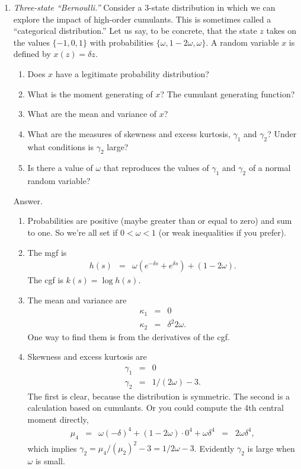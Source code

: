 \begin{enumerate}
\begin{enumerate}
\end{enumerate}

\item {\it Three-state ``Bernoulli.''\/}
Consider a 3-state distribution
in which we can explore the impact of high-order cumulants.
This is sometimes called a ``categorical distribution.''
Let us say, to be concrete, that the state $z$ takes on the values
 $\{-1, 0, 1\}$ with
 probabilities $\{\omega, 1-2\omega, \omega \}$.
 A random variable $x$ is defined by $x(z) = \delta z$.

\begin{enumerate}
\item Does $x$ have a legitimate probability distribution?
\item What is the moment generating of $x$?  The cumulant generating function?
\item What are the mean and variance of $x$?
\item What are the measures of skewness and excess kurtosis,
$\gamma_1$ and $\gamma_2$?
Under what conditions is $\gamma_2$ large?
\item Is there a value of $\omega$ that reproduces the values
of $\gamma_1$ and $\gamma_2$ of a normal random variable?
\end{enumerate}

Answer.
\begin{enumerate}
\item Probabilities are positive (maybe greater than or equal to zero)
and sum to one.
So we're all set if $ 0 < \omega < 1$
(or weak inequalities if you prefer).

\item The mgf is
\begin{eqnarray*}
    h(s) &=& \omega (e^{-\delta s} + e^{\delta s}) + (1-2\omega).
\end{eqnarray*}
The cgf is $k(s) = \log h(s)$.

\item The mean and variance are
\begin{eqnarray*}
    \kappa_1  &=& 0 \\
    \kappa_2  &=& \delta^2 2 \omega .
\end{eqnarray*}
One way to find them is from the derivatives of the cgf.

\item Skewness and excess kurtosis are
\begin{eqnarray*}
    \gamma_1  &=& 0 \\
    \gamma_2  &=& 1/(2 \omega) - 3 .
\end{eqnarray*}
The first is clear, because the distribution is symmetric.
The second is a calculation based on cumulants.
Or you could compute the 4th central moment directly,
\begin{eqnarray*}
    \mu_4 &=&  \omega (-\delta)^4 + (1-2\omega) \cdot 0^4 + \omega \delta^4 \;\;=\;\;
        2 \omega \delta^4 ,
\end{eqnarray*}
which implies $\gamma_2 = \mu_4 /(\mu_2)^2 - 3  = 1/2\omega - 3 $.
Evidently $\gamma_2$ is large when $\omega$ is small.


\end{enumerate}
\end{enumerate}
